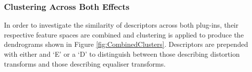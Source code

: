 		\subsubsection*{Clustering Across Both Effects}
			In order to investigate the similarity of descriptors across both plug-ins, their respective
			feature spaces are combined and clustering is applied to produce the dendrograms shown in Figure
			\ref{fig:CombinedClusters}. Descriptors are prepended with either and `E' or a `D' to distinguish
			between those describing distortion transforms and those describing equaliser transforms.

			\begin{figure}[h!]
				\centering
\end{figure}

